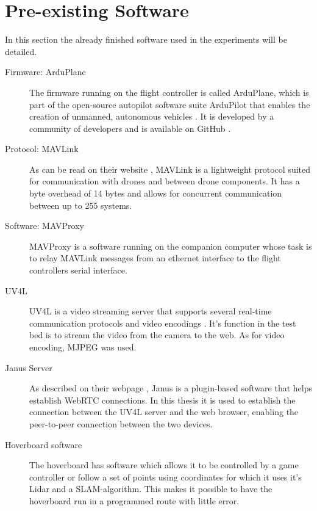\documentclass[nofilelist]{cslthse-msc}
\begin{document}
\section{Pre-existing Software}
In this section the already finished software used in the experiments will be detailed.

\begin{description}
   \item[Firmware: ArduPlane]
   The firmware running on the flight controller is called ArduPlane, which is part of the open-source autopilot software suite ArduPilot that enables the creation of unmanned, autonomous vehicles \cite{ardupilot-org}. It is developed by a community of developers and is available on GitHub \cite{ardupilot-github}.
   
   \item[Protocol: MAVLink]
   As can be read on their website \cite{mavlink}, MAVLink is a lightweight protocol suited for communication with drones and between drone components. It has a byte overhead of 14 bytes and allows for concurrent communication between up to 255 systems. 

   \item [Software: MAVProxy]
   MAVProxy \cite{mavproxy} is a software running on the companion computer whose task is to relay MAVLink messages from an ethernet interface to the flight controllers serial interface. 

   \item[UV4L]
   UV4L is a video streaming server that supports several real-time communication protocols and video encodings \cite{uv4l}. It's function in the test bed is to stream the video from the camera to the web. As for video encoding, MJPEG was used.
   
   \item[Janus Server]
   As described on their webpage \cite{janus}, Janus is a plugin-based software that helps establish WebRTC connections. In this thesis it is used to establish the connection between the UV4L server and the web browser, enabling the peer-to-peer connection between the two devices.

   \item[Hoverboard software] The hoverboard has software which allows it to be controlled by a game controller or follow a set of points using coordinates for which it uses it's Lidar and a SLAM-algorithm. This makes it possible to have the hoverboard run in a programmed route with little error. 
\end{description}
\end{document}
